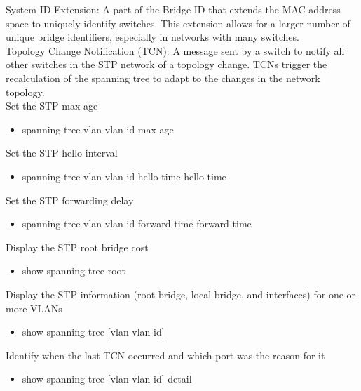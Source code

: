 \documentclass{article}
\begin{document}
System ID Extension: A part of the Bridge ID that extends the MAC address space to uniquely identify switches. This extension allows for a larger number of unique bridge identifiers, especially in networks with many switches.\\

Topology Change Notification (TCN): A message sent by a switch to notify all other switches in the STP network of a topology change. TCNs trigger the recalculation of the spanning tree to adapt to the changes in the network topology.\\

Set the STP max age
\begin{itemize}
\item spanning-tree vlan vlan-id max-age
\end{itemize}
Set the STP hello interval
\begin{itemize}
\item spanning-tree vlan vlan-id hello-time hello-time
\end{itemize}
Set the STP forwarding delay
\begin{itemize}
\item spanning-tree vlan vlan-id forward-time forward-time
\end{itemize}
Display the STP root bridge cost
\begin{itemize}
\item show spanning-tree root
\end{itemize}
Display the STP information (root bridge, local bridge, and interfaces) for one or more VLANs
\begin{itemize}
\item show spanning-tree [vlan vlan-id]
\end{itemize}
Identify when the last TCN occurred and which port was the reason for it
\begin{itemize}
\item show spanning-tree [vlan vlan-id] detail
\end{itemize}
\end{document}
